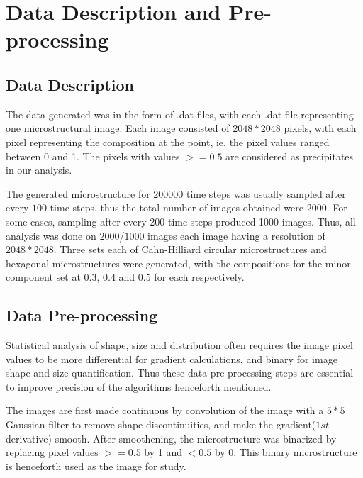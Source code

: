\documentclass[12pt, a4paper]{report}
\begin{document}
\pagestyle{plain}
\def\title{Microstructure Statistics}
\def\what{Dual Degree Project}
\def\who{Iyer Adithya Jairam (16D110011)}
\def\guide{Prof. M P Gururajan and Prof. Hina Gokhale}

\titlpage
\tableofcontents
\listoffigures


\newpage
{}



\chapter{Data Description and Pre-processing}

\section{Data Description}
The data generated was in the form of .dat files, with each .dat file representing one microstructural image. Each image consisted of $2048* 2048$ pixels, with each pixel representing the composition at the point, ie. the pixel values ranged between 0 and 1. The pixels with values $>=0.5$ are considered as precipitates in our analysis.

The generated microstructure for $200000$ time steps was usually sampled after every $100$ time steps, thus the total number of images obtained were $2000$. For some cases, sampling after every 200 time steps produced 1000 images. Thus, all analysis was done on $2000$/$1000$ images each image having a resolution of $2048*2048$. Three sets each of Cahn-Hilliard circular microstructures and hexagonal microstructures were generated, with the compositions for the minor component set at $0.3$, $0.4$ and $0.5$ for each respectively.


\section{Data Pre-processing}
Statistical analysis of shape, size and distribution often requires the image pixel values to be more differential for gradient calculations, and binary for image shape and size quantification. Thus these data pre-processing steps are essential to improve precision of the algorithms henceforth mentioned.

The images are first made continuous by convolution of the image with a $5*5$ Gaussian filter to remove shape discontinuities, and make the gradient($1st$ derivative) smooth. After smoothening, the microstructure was binarized by replacing pixel values $>=0.5$ by 1 and $<0.5$ by 0. This binary microstructure is henceforth used as the image for study.
\end{document}
